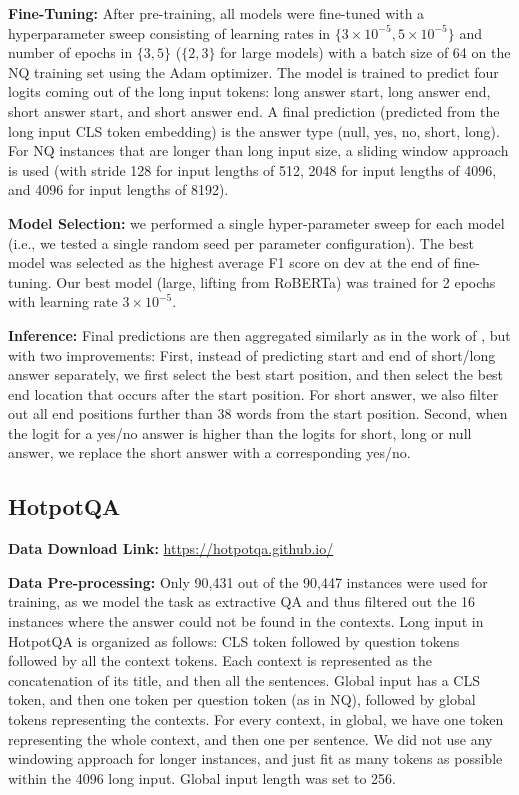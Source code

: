 \documentclass[11pt,a4paper]{article}
\begin{document}
{\bf Fine-Tuning:} After pre-training, all models were fine-tuned with a hyperparameter sweep consisting of learning rates in $\{3\times10^{-5}, 5\times10^{-5}\}$ and number of epochs in $\{3, 5\}$ ($\{2, 3\}$ for large models) with a batch size of 64 on the NQ training set using the Adam optimizer. The model is trained to predict four logits coming out of the long input tokens: long answer start, long answer end, short answer start, and short answer end. A final prediction (predicted from the long input CLS token embedding) is the answer type (null, yes, no, short, long). For NQ instances that are longer than long input size, a sliding window approach is used (with stride 128 for input lengths of 512, 2048 for input lengths of 4096, and 4096 for input lengths of 8192).

{\bf Model Selection:} we performed a single hyper-parameter sweep for each model (i.e., we tested a single random seed per parameter configuration). The best model was selected as the highest average F1 score on dev at the end of fine-tuning. Our best model (large, lifting from RoBERTa) was trained for 2 epochs with learning rate $3\times10^{-5}$.


{\bf Inference:} Final predictions are then aggregated similarly as in the work of \citet{alberti2019bert}, but with two improvements: First, instead of predicting start and end of short/long answer separately, we first select the best start position, and then select the best end location that occurs after the start position. For short answer, we also filter out all end positions further than 38 words from the start position. Second, when the logit for a yes/no answer is higher than the logits for short, long or null answer, we replace the short answer with a corresponding yes/no.


\subsection*{HotpotQA}

{\bf Data Download Link:} \url{https://hotpotqa.github.io/}


{\bf Data Pre-processing:}  Only 90,431 out of the 90,447 instances were used for training, as we model the task as extractive QA and thus filtered out the 16 instances where the answer could not be found in the contexts. Long input in HotpotQA is organized as follows: CLS token followed by question tokens followed by all the context tokens. Each context is represented as the concatenation of its title, and then all the sentences. Global input has a CLS token, and then one token per question token (as in NQ), followed by global tokens representing the contexts. For every context, in global, we have one token representing the whole context, and then one per sentence. We did not use any windowing approach for longer instances, and just fit as many tokens as possible within the 4096 long input. Global input length was set to 256. 
\end{document}
